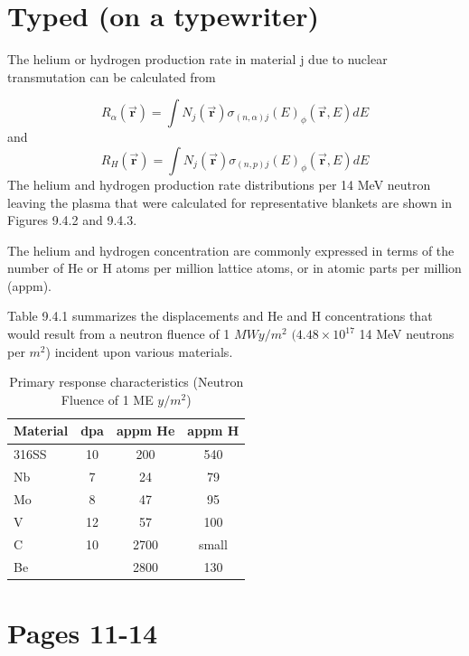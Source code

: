 \documentclass[11pt]{article}
\begin{document}
\section{Typed (on a typewriter)}

The helium or hydrogen production rate in material j due to nuclear transmutation can be calculated from

\begin{equation}
	R_{\alpha}(\vec{\mathbf{r}}) = \int N_j(\vec{\mathbf{r}}) \sigma_{(n,\alpha)j}(E)_{\phi}(\vec{\mathbf{r}},E) dE
\end{equation}
and
\begin{equation}
	R_{H}(\vec{\mathbf{r}}) = \int N_j(\vec{\mathbf{r}}) \sigma_{(n,p)j}(E)_{\phi}(\vec{\mathbf{r}},E) dE
\end{equation}
The helium and hydrogen production rate distributions per 14 MeV neutron leaving the plasma that were calculated for representative blankets are shown in Figures 9.4.2 and 9.4.3.

The helium and hydrogen concentration are commonly expressed in terms of the number of He or H atoms per million lattice atoms, or in atomic parts per million (appm).

Table 9.4.1 summarizes the displacements and He and H concentrations that would result from a neutron fluence of 1 $MW y/m^2$ $(4.48\times 10^{17}$ 14 MeV neutrons per $m^2$) incident upon various materials.
\begin{table}
\centering
\begin{tabular}{|lccc|}
\hline
Material & dpa & appm He & appm H \\
\hline
316SS & 10 & 200  & 540   \\
Nb    & 7  & 24   & 79    \\
Mo    & 8  & 47   & 95    \\
V     & 12 & 57   & 100   \\
C     & 10 & 2700 & small \\
Be    &    & 2800 & 130   \\
\hline
\end{tabular}
\caption{Primary response characteristics (Neutron Fluence of 1 ME $y/m^2$)}
\end{table}

\newpage
\section{Pages 11-14}
\end{document}
